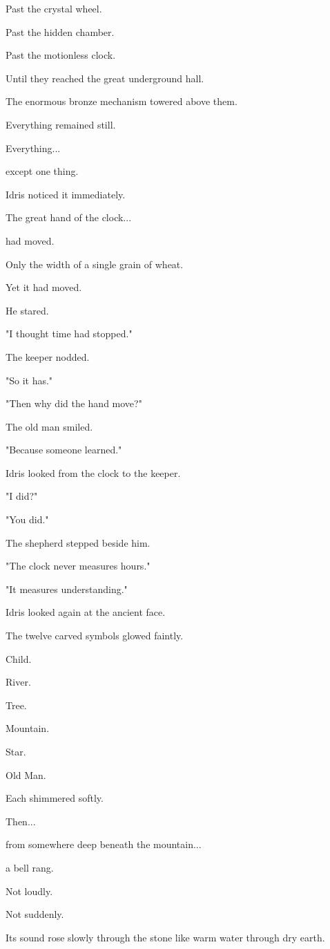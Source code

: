 \documentclass[12pt,openany]{book}
\begin{document}
Past the crystal wheel.

Past the hidden chamber.

Past the motionless clock.

Until they reached the great underground hall.

The enormous bronze mechanism towered above them.

Everything remained still.

Everything...

except one thing.

Idris noticed it immediately.

The great hand of the clock...

had moved.

Only the width of a single grain of wheat.

Yet it had moved.

He stared.

"I thought time had stopped."

The keeper nodded.

"So it has."

"Then why did the hand move?"

The old man smiled.

"Because someone learned."

Idris looked from the clock to the keeper.

"I did?"

"You did."

The shepherd stepped beside him.

"The clock never measures hours."

"It measures understanding."

Idris looked again at the ancient face.

The twelve carved symbols glowed faintly.

Child.

River.

Tree.

Mountain.

Star.

Old Man.

Each shimmered softly.

Then...

from somewhere deep beneath the mountain...

a bell rang.

Not loudly.

Not suddenly.

Its sound rose slowly through the stone like warm water through dry earth.
\end{document}
